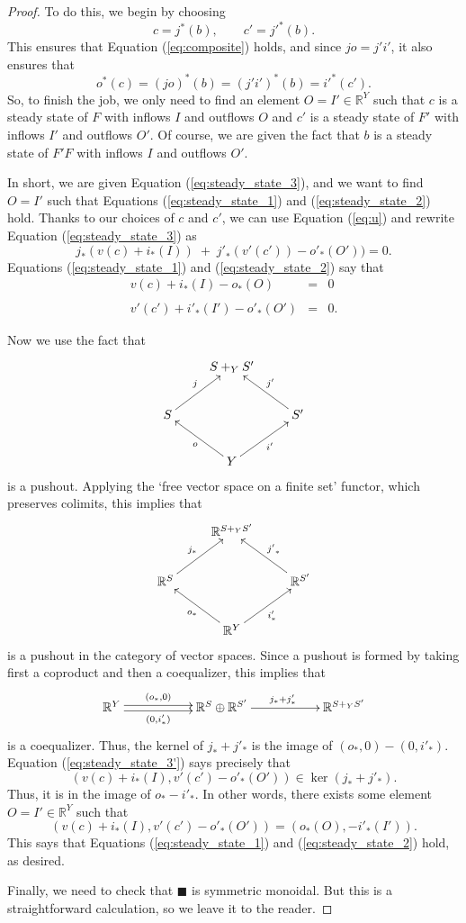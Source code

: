 \documentclass{compositionalityarticle}
\newcommand{\R}{\mathbb{R}}
\theoremstyle{plain}
\theoremstyle{remark}
\begin{document}
\begin{proof}
To do this, we begin by choosing
\[   c = j^*(b), \qquad c' = {j'}^*(b) .\]
This ensures that Equation (\ref{eq:composite}) holds, and since $jo = j'i'$, it also ensures that 
\[  o^*(c) = (jo)^*(b) = (j'i')^*(b) = {i'}^*(c')  .\]
So, to finish the job, we only need to find an element $O = I' \in \R^Y$ such that $c$ is a steady state of $F$ with inflows $I$ and outflows $O$ and $c'$ is a steady state of $F'$ with inflows $I'$ and outflows $O'$.  Of course, we are given the fact that $b$ is a steady state of $F'F$ with inflows $I$ and outflows $O'$.   

In short, we are given Equation (\ref{eq:steady_state_3}), and we want to find $O = I'$ such that Equations (\ref{eq:steady_state_1}) and (\ref{eq:steady_state_2}) hold.  Thanks to our choices of $c$ and $c'$,  we can use Equation (\ref{eq:u}) and rewrite Equation (\ref{eq:steady_state_3}) as
\begin{equation}
\label{eq:steady_state_3'}
  j_*(v(c) + i_*(I)) \; + \; {j'}_*(v'(c')) - {o'}_*(O')) = 0 .  
\end{equation}
Equations  (\ref{eq:steady_state_1}) and (\ref{eq:steady_state_2}) say that
\begin{equation}
\label{eq:steady_state_1'2'}
\begin{array}{lcl}
   v(c) + i_*(I) - {o}_*(O) &=& 0 \\  \\
   v'(c') + {i'}_*(I') - {o'}_*(O') &=& 0.
\end{array}
\end{equation}

Now we use the fact that 
\[
    \xymatrix{
      & S +_Y S' \\
       S \ar[ur]^{j} && S' \ar[ul]_{j'} \\
       & Y \ar[ul]^{o} \ar[ur]_{i'} &
    }
\]
is a pushout.  Applying the `free vector space on a finite set' functor, which preserves colimits, this implies that
\[
    \xymatrix{
      & \R^{S +_Y S'} \\
       \R^S \ar[ur]^{j_*} && \R^{S'} \ar[ul]_{{j'}_*} \\
       & \R^Y \ar[ul]^{o_*} \ar[ur]_{i'_*} &
    }
\]
is a pushout in the category of vector spaces.   Since a pushout is formed by taking first a coproduct and then a coequalizer, this implies that 
\[
     \xymatrix{
      \R^Y \ar@<-.5ex>[rr]_-{(0,i'_*)} \ar@<.5ex>[rr]^-{(o_*,0)} && \R^S \oplus \R^{S'} \ar[rr]^{j_* + j'_*}
   && \R^{S +_Y S'}
}
\]
is a coequalizer.  Thus, the kernel of $j_* + j'_*$ is the image of $(o_*,0) - (0,i'_*)$.   Equation (\ref{eq:steady_state_3'}) says precisely that 
\[    (v(c) + i_*(I), v'(c') - o'_*(O')) \in \ker(j_* + j'_*)  .\]
Thus, it is in the image of $o_* - i'_*$.  In other words, there exists some element $O = I' \in \R^Y$
such that 
\[   (v(c) + i_*(I), v'(c') - o'_*(O')) = (o_*(O), -i'_*(I')).\]
This says that Equations (\ref{eq:steady_state_1}) and (\ref{eq:steady_state_2}) hold, as desired.

Finally, we need to check that $\blacksquare$ is symmetric monoidal.  But this is a straightforward calculation, so we leave it to the reader.
\end{proof}
\end{document}
